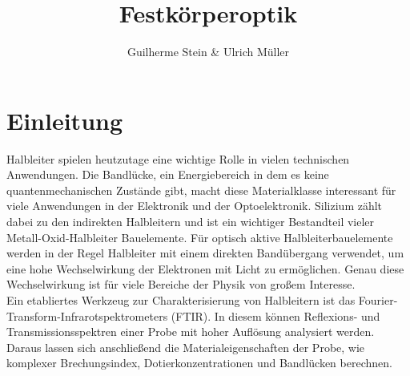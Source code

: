 \documentclass[paper=a4,fontsize=10pt,DIV=18,twocolumn,parskip=half]{scrartcl}
\numberwithin{equation}{section}    %
\begin{document}
\title{Festkörperoptik}                  
\author{Guilherme Stein \& Ulrich Müller}         
\date{}                             %



\section{Einleitung}

Halbleiter spielen heutzutage eine wichtige Rolle in vielen technischen Anwendungen. Die Bandlücke, ein Energiebereich in dem es keine quantenmechanischen Zustände gibt, macht diese Materialklasse interessant für viele Anwendungen in der Elektronik und der Optoelektronik. Silizium zählt dabei zu den indirekten Halbleitern und ist ein wichtiger Bestandteil vieler Metall-Oxid-Halbleiter Bauelemente. Für optisch aktive Halbleiterbauelemente werden in der Regel Halbleiter mit einem direkten Bandübergang verwendet, um eine hohe Wechselwirkung der Elektronen mit Licht zu ermöglichen. Genau diese Wechselwirkung ist für viele Bereiche der Physik von großem Interesse. \\
Ein etabliertes Werkzeug zur Charakterisierung von Halbleitern ist das Fourier-Transform-Infrarotspektrometers (FTIR). In diesem können Reflexions- und Transmissionsspektren einer Probe mit hoher Auflösung analysiert werden. Daraus lassen sich anschließend die Materialeigenschaften der Probe, wie komplexer Brechungsindex, Dotierkonzentrationen und Bandlücken berechnen. 
\end{document}
